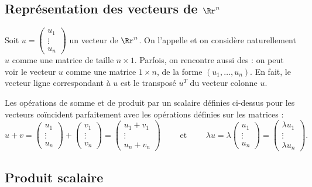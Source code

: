 \documentclass[class=report,crop=false]{standalone}
\begin{document}
\subsection{Représentation des vecteurs de $\Rr^n$}


Soit $u = \left(\begin{smallmatrix} u_1\\ \vdots \\ u_n \end{smallmatrix}\right)$ un vecteur de $\Rr^n$.
On l'appelle  et on considère
naturellement $u$ comme une matrice de taille $n\times 1$. Parfois, on
rencontre aussi des  : on
peut voir le vecteur $u$ comme une matrice $1\times n$, de la forme
$(u_1,\dots,u_n)$. En fait, le vecteur ligne correspondant à $u$
est le transposé $u^T$ du vecteur colonne $u$.

Les opérations de somme et de produit par un scalaire définies ci-dessus
pour les vecteurs coïncident parfaitement avec les opérations définies sur
les matrices :
$$
u + v =
\begin{pmatrix}
u_1\\
\vdots\\
u_n\end{pmatrix} +
\begin{pmatrix}
v_1\\
\vdots\\
v_n\end{pmatrix} =
\begin{pmatrix}
u_1 + v_1\\
\vdots\\
u_n + v_n\end{pmatrix}
\qquad \text{ et } \qquad
\lambda u =
\lambda \begin{pmatrix}
u_1\\
\vdots\\
u_n\end{pmatrix} =
\begin{pmatrix}
\lambda u_1\\
\vdots\\
\lambda u_n\end{pmatrix}.
$$


\subsection{Produit scalaire}
\end{document}
